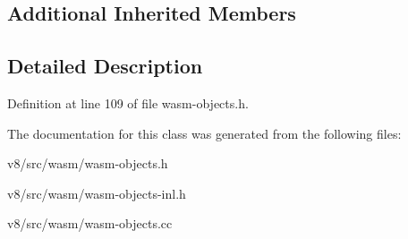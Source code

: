 \subsection*{Additional Inherited Members}


\subsection{Detailed Description}


Definition at line 109 of file wasm-\/objects.\+h.



The documentation for this class was generated from the following files\+:\begin{DoxyCompactItemize}
\item 
v8/src/wasm/wasm-\/objects.\+h\item 
v8/src/wasm/wasm-\/objects-\/inl.\+h\item 
v8/src/wasm/wasm-\/objects.\+cc\end{DoxyCompactItemize}
